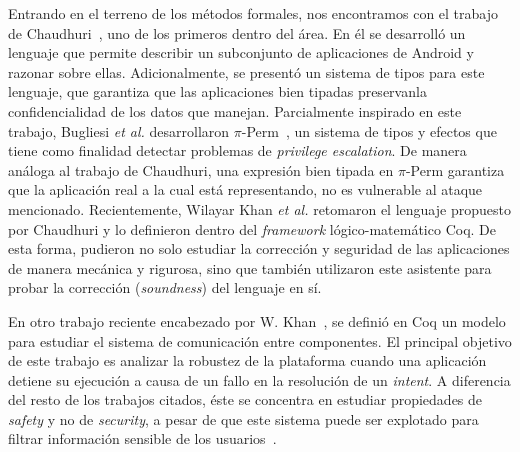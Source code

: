 Entrando en el terreno de los métodos formales, nos encontramos con el trabajo
de Chaudhuri~\cite{chaudhuri}, uno de los primeros dentro del área. En él se
desarrolló un lenguaje que permite describir un subconjunto de aplicaciones de
Android y razonar sobre ellas. Adicionalmente, se presentó un sistema de tipos
para este lenguaje, que garantiza que las aplicaciones bien tipadas preservanla
confidencialidad de los datos que manejan. Parcialmente inspirado en este
trabajo, Bugliesi \textit{et al.} desarrollaron $\pi$-Perm~\cite{bugliesi}, un
sistema de tipos y efectos que tiene como finalidad detectar problemas de
\textit{privilege escalation}. De manera análoga al trabajo de Chaudhuri, una
expresión bien tipada en $\pi$-Perm garantiza que la aplicación real a la cual
está representando, no es vulnerable al ataque mencionado. Recientemente,
Wilayar Khan \textit{et al.} retomaron el lenguaje propuesto por Chaudhuri y lo
definieron dentro del \textit{framework} lógico-matemático Coq\cite{coq}. De
esta forma, pudieron no solo estudiar la corrección y seguridad de las
aplicaciones de manera mecánica y rigurosa, sino que también utilizaron este
asistente para probar la corrección (\textit{soundness}) del lenguaje en sí.

En otro trabajo reciente encabezado por W. Khan~\cite{crashsafe}, se definió en
Coq un modelo para estudiar el sistema de comunicación entre componentes. El
principal objetivo de este trabajo es analizar la robustez de la plataforma
cuando una aplicación detiene su ejecución a causa de un fallo en la resolución
de un \textit{intent}. A diferencia del resto de los trabajos citados, éste se
concentra en estudiar propiedades de \textit{safety} y no de \textit{security}, a
pesar de que este sistema puede ser explotado para filtrar información sensible de
los usuarios~\cite{iccta}.

